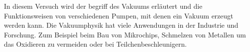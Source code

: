 In diesem Versuch wird der begriff des Vakuums erläutert und die Funktionsweisen von verschiedenen Pumpen, mit denen ein Vakuum erzeugt werden kann. Die Vakuumphysik hat viele Anwendungen in der Industrie und Forschung. Zum Beispiel beim Bau von Mikrochips, Schmelzen von Metallen um das Oxidieren zu vermeiden oder bei Teilchenbeschleunigern.